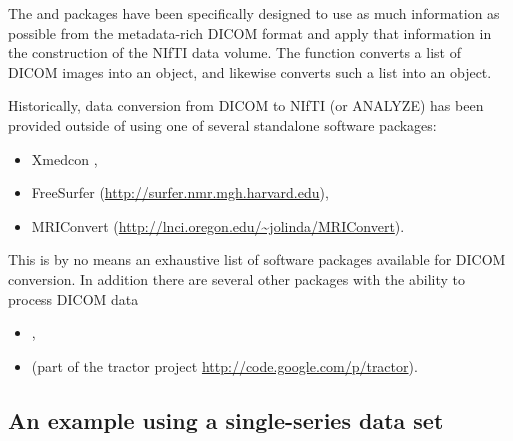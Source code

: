 \documentclass[article,nojss,shortnames]{jss}
\begin{document}
The  and  packages have been
specifically designed to use as much information as possible from the
metadata-rich DICOM format and apply that information in the
construction of the NIfTI data volume.  The function
 converts a list of DICOM images into an
 object, and likewise  converts such a
list into an  object.

Historically, data conversion from DICOM to NIfTI (or ANALYZE) has
been provided outside of  using one of several standalone
software packages:
\begin{itemize}
\item Xmedcon \citep{xmedcon}, 
\item FreeSurfer (\url{http://surfer.nmr.mgh.harvard.edu}),
\item MRIConvert (\url{http://lnci.oregon.edu/\~jolinda/MRIConvert}).
\end{itemize}
This is by no means an exhaustive list of software packages available
for DICOM conversion.  In addition there are several other 
 packages with the ability to process DICOM data
\begin{itemize}
\item {} \citep{pol-tab:fmri},
\item {} \citep{tractor.base} (part of the tractor
  project \url{http://code.google.com/p/tractor}).
\end{itemize}

\subsection{An example using a single-series data set}
\end{document}
